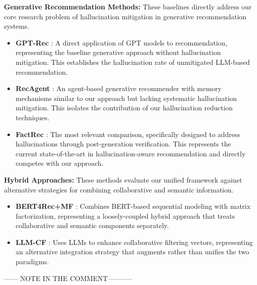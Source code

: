 \documentclass[acmsmall]{acmart}
\begin{document}
\textbf{Generative Recommendation Methods:}
These baselines directly address our core research problem of hallucination mitigation in generative recommendation systems.

\begin{itemize}
\item \textbf{GPT-Rec} \cite{kim2024gpt}: A direct application of GPT models to recommendation, representing the baseline generative approach without hallucination mitigation. This establishes the hallucination rate of unmitigated LLM-based recommendation.
\item \textbf{RecAgent} \cite{mitchell2024recagent}: An agent-based generative recommender with memory mechanisms similar to our approach but lacking systematic hallucination mitigation. This isolates the contribution of our hallucination reduction techniques.
\item \textbf{FactRec} \cite{li2024factrec}: The most relevant comparison, specifically designed to address hallucinations through post-generation verification. This represents the current state-of-the-art in hallucination-aware recommendation and directly competes with our approach.
\end{itemize}

\textbf{Hybrid Approaches:}
These methods evaluate our unified framework against alternative strategies for combining collaborative and semantic information.

\begin{itemize}
\item \textbf{BERT4Rec+MF} \cite{sun2021bert4rec}: Combines BERT-based sequential modeling with matrix factorization, representing a loosely-coupled hybrid approach that treats collaborative and semantic components separately.
\item \textbf{LLM-CF} \cite{wu2024llm}: Uses LLMs to enhance collaborative filtering vectors, representing an alternative integration strategy that augments rather than unifies the two paradigms.
\end{itemize}
------ NOTE IN THE COMMENT-----------
\end{document}

